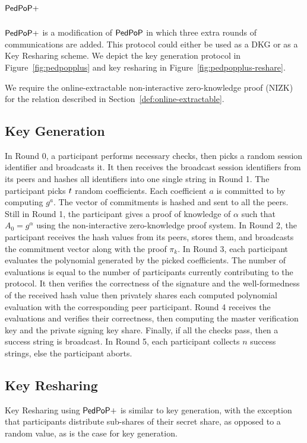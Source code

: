 \section{$\mathsf{PedPoP+}$}

$\mathsf{PedPoP+}$ is a modification of $\mathsf{PedPoP}$ in which three extra rounds of communications are added.
This protocol could either be used as a DKG or as a Key Resharing scheme.
We depict the key generation protocol in Figure~\ref{fig:pedpopplus} and
key resharing in Figure~\ref{fig:pedpopplus-reshare}.

We require the online-extractable non-interactive zero-knowledge proof (NIZK) for the relation described in
Section~\ref{def:online-extractable}.

\subsection{Key Generation}\label{sec:key-generation}
In Round 0, a participant performs necessary checks, then picks a random session identifier and broadcasts it.
It then receives the broadcast session identifiers from its peers and hashes all identifiers into one single string in Round 1.
The participant picks $t$ random coefficients. Each coefficient $a$ is committed to by computing $g^a$.
The vector of commitments is hashed and sent to all the peers.
Still in Round 1, the participant gives a proof of knowledge of $\alpha$ such that $A_0 = g^\alpha$ using the non-interactive zero-knowledge proof system.
In Round 2, the participant receives the hash values from its peers, stores them, and broadcasts the commitment vector along with the proof $\pi_k$.
In Round 3, each participant evaluates the polynomial generated by the picked coefficients.
The number of evaluations is equal to the number of participants currently contributing to the protocol.
It then verifies the correctness of the signature and the well-formedness of the received hash value then privately shares each computed polynomial evaluation with the corresponding peer participant.
Round 4 receives the evaluations and verifies their correctness, then computing the master verification key and the private signing key share.
Finally, if all the checks pass, then a success string is broadcast.
In Round 5, each participant collects $n$ success strings,
else the participant aborts.

\subsection{Key Resharing}\label{sec:key-resharing}
Key Resharing using $\mathsf{PedPoP+}$ is similar to key generation,
with the exception that participants distribute sub-shares of their secret share,
as opposed to a random value, as is the case for key generation.

